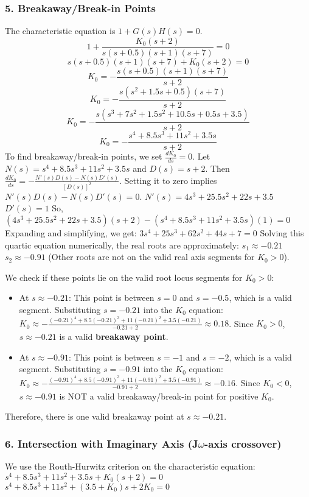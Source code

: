 \documentclass{article}
\begin{document}
	\subsubsection*{5. Breakaway/Break-in Points}
	The characteristic equation is $1 + G(s)H(s) = 0$.
	$$ 1 + \frac{K_0(s+2)}{s(s+0.5)(s+1)(s+7)} = 0 $$
	$$ s(s+0.5)(s+1)(s+7) + K_0(s+2) = 0 $$
	$$ K_0 = -\frac{s(s+0.5)(s+1)(s+7)}{s+2} $$
	$$ K_0 = -\frac{s(s^2+1.5s+0.5)(s+7)}{s+2} $$
	$$ K_0 = -\frac{s(s^3+7s^2+1.5s^2+10.5s+0.5s+3.5)}{s+2} $$
	$$ K_0 = -\frac{s^4+8.5s^3+11s^2+3.5s}{s+2} $$
	To find breakaway/break-in points, we set $\frac{dK_0}{ds} = 0$.
	Let $N(s) = s^4+8.5s^3+11s^2+3.5s$ and $D(s) = s+2$.
	Then $\frac{dK_0}{ds} = -\frac{N'(s)D(s) - N(s)D'(s)}{[D(s)]^2}$. Setting it to zero implies $N'(s)D(s) - N(s)D'(s) = 0$.
	$N'(s) = 4s^3 + 25.5s^2 + 22s + 3.5$
	$D'(s) = 1$
	So, $(4s^3 + 25.5s^2 + 22s + 3.5)(s+2) - (s^4 + 8.5s^3 + 11s^2 + 3.5s)(1) = 0$
	Expanding and simplifying, we get:
	$3s^4 + 25s^3 + 62s^2 + 44s + 7 = 0$
	Solving this quartic equation numerically, the real roots are approximately:
	$s_1 \approx -0.21$
	$s_2 \approx -0.91$
	(Other roots are not on the valid real axis segments for $K_0 > 0$).
	
	We check if these points lie on the valid root locus segments for $K_0 > 0$:
	\begin{itemize}
		\item At $s \approx -0.21$: This point is between $s=0$ and $s=-0.5$, which is a valid segment.
		Substituting $s = -0.21$ into the $K_0$ equation:
		$K_0 \approx -\frac{(-0.21)^4 + 8.5(-0.21)^3 + 11(-0.21)^2 + 3.5(-0.21)}{-0.21+2} \approx 0.18$.
		Since $K_0 > 0$, $s \approx -0.21$ is a valid \textbf{breakaway point}.
		\item At $s \approx -0.91$: This point is between $s=-1$ and $s=-2$, which is a valid segment.
		Substituting $s = -0.91$ into the $K_0$ equation:
		$K_0 \approx -\frac{(-0.91)^4 + 8.5(-0.91)^3 + 11(-0.91)^2 + 3.5(-0.91)}{-0.91+2} \approx -0.16$.
		Since $K_0 < 0$, $s \approx -0.91$ is NOT a valid breakaway/break-in point for positive $K_0$.
	\end{itemize}
	Therefore, there is one valid breakaway point at $s \approx -0.21$.
	
	\subsubsection*{6. Intersection with Imaginary Axis (J$\omega$-axis crossover)}
	We use the Routh-Hurwitz criterion on the characteristic equation:
	$s^4 + 8.5s^3 + 11s^2 + 3.5s + K_0(s+2) = 0$
	$s^4 + 8.5s^3 + 11s^2 + (3.5+K_0)s + 2K_0 = 0$
	
\end{document}

